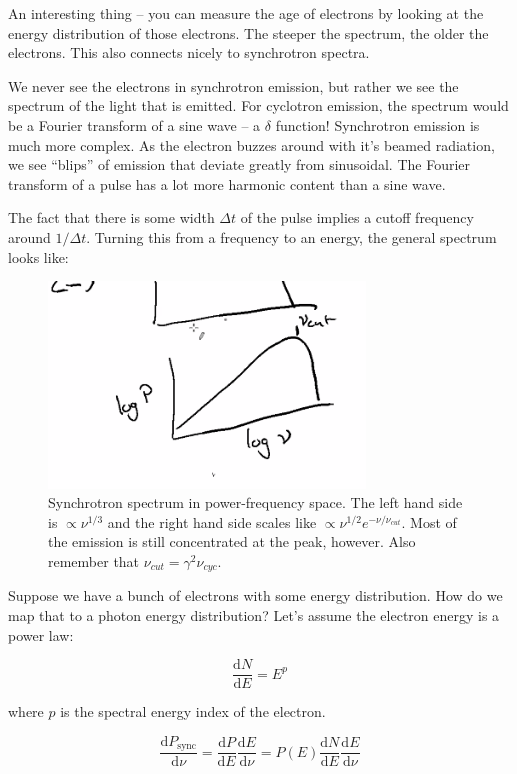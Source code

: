 \documentclass{article}
\begin{document}
An interesting thing -- you can measure the age of electrons by looking at the energy distribution of those  electrons. The steeper the spectrum, the older the electrons. This also connects nicely to synchrotron spectra.

We never see the electrons in synchrotron emission, but rather we see the spectrum of the light that is emitted. For cyclotron emission, the spectrum would be a Fourier transform of a sine wave -- a $\delta$ function! Synchrotron emission is much more complex. As the electron buzzes around with it's beamed radiation, we see ``blips'' of emission that deviate greatly from sinusoidal. The Fourier transform of a pulse has a lot more harmonic content than a sine wave. 

The fact that there is some width $\Delta t$ of the pulse implies a cutoff frequency around $1/\Delta t$. Turning this from a frequency to an energy, the general spectrum looks like:

\begin{figure}
    \centering
    \includegraphics[width=0.75\textwidth]{Screen Shot 2020-11-10 at 12.06.34 PM.png}
    \caption{Synchrotron spectrum in power-frequency space. The left hand side is $\propto \nu^{1/3}$ and the right hand side scales like $\propto \nu^{1/2}e^{-\nu/\nu_{cut}}$. Most of the emission is still concentrated at the peak, however. Also remember that $\nu_{cut} = \gamma^2 \nu_{cyc}$. }
    \label{fig:syncP}
\end{figure}

Suppose we have a bunch of electrons with some energy distribution. How do we map that to a photon energy distribution? Let's assume the electron energy is a power law:

$$
\frac{\mathrm{d}N}{\mathrm{d}E} = E^{p}
$$

where $p$ is the spectral energy index of the electron.

$$
\frac{\mathrm{d}P_\text{sync}}{\mathrm{d}\nu} = \frac{\mathrm{d}P}{\mathrm{d}E}\frac{\mathrm{d}E}{\mathrm{d}\nu} = P(E) \frac{\mathrm{d}N}{\mathrm{d}E}\frac{\mathrm{d}E}{\mathrm{d}\nu}
$$
\end{document}
